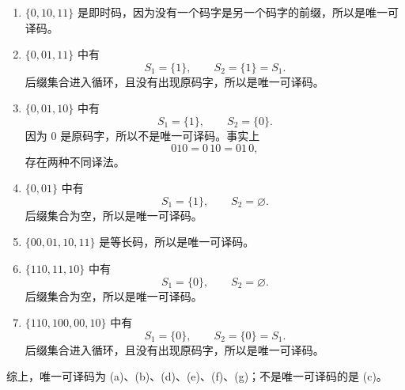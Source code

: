 \documentclass[UTF8,11pt,a4paper]{ctexart}
\begin{document}
\begin{enumerate}[label=\textnormal{(\alph*)}]
  \item \(\{0,10,11\}\) 是即时码，因为没有一个码字是另一个码字的前缀，所以是唯一可译码。

  \item \(\{0,01,11\}\) 中有
  \[
  S_1=\{1\},\qquad S_2=\{1\}=S_1.
  \]
  后缀集合进入循环，且没有出现原码字，所以是唯一可译码。

  \item \(\{0,01,10\}\) 中有
  \[
  S_1=\{1\},\qquad S_2=\{0\}.
  \]
  因为 $0$ 是原码字，所以不是唯一可译码。事实上
  \[
  010=0\,10=01\,0,
  \]
  存在两种不同译法。

  \item \(\{0,01\}\) 中有
  \[
  S_1=\{1\},\qquad S_2=\varnothing.
  \]
  后缀集合为空，所以是唯一可译码。

  \item \(\{00,01,10,11\}\) 是等长码，所以是唯一可译码。

  \item \(\{110,11,10\}\) 中有
  \[
  S_1=\{0\},\qquad S_2=\varnothing.
  \]
  后缀集合为空，所以是唯一可译码。

  \item \(\{110,100,00,10\}\) 中有
  \[
  S_1=\{0\},\qquad S_2=\{0\}=S_1.
  \]
  后缀集合进入循环，且没有出现原码字，所以是唯一可译码。
\end{enumerate}

综上，唯一可译码为 (a)、(b)、(d)、(e)、(f)、(g)；不是唯一可译码的是 (c)。
\vspace{0.8em}
\end{document}

